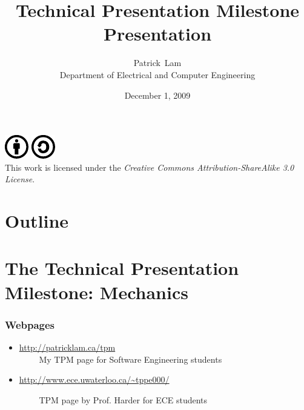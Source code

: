\documentclass{beamer}
\title{Technical Presentation Milestone Presentation}
\author{Patrick~Lam\\Department of Electrical and Computer Engineering}
\date{December 1, 2009}
\begin{document}
\newcommand{\CcNote}[1]{%
	This work is licensed under the \textit{Creative Commons #1 3.0 License}.%
}
\newcommand{\CcImageBy}[1]{%
	\includegraphics[scale=#1]{creative_commons/cc_by_30.pdf}%
}
\newcommand{\CcImageSa}[1]{%
	\includegraphics[scale=#1]{creative_commons/cc_sa_30.pdf}%
}
\newcommand{\CcGroupBySa}[2]{%
	\CcImageBy{#1}\hspace*{#2}\CcImageSa{#1}%
}
\newcommand{\CcLongnameBySa}{Attribution-ShareAlike}

\begin{frame}
  \titlepage

  \vfill
  \begin{center}
    \CcGroupBySa{0.83}{0.95ex}\\
		  {\tiny\CcNote{\CcLongnameBySa}}
		  \vspace*{-2.5ex}
  \end{center}

\end{frame}

\section*{Outline}
\begin{frame}
  \tableofcontents
\end{frame}

\section[TPM]{The Technical Presentation Milestone: Mechanics}

\begin{frame}
\frametitle{Webpages}

\begin{itemize}
\item[] {\large
\url{http://patricklam.ca/tpm}
}\\
$\qquad$ My TPM page for Software Engineering students\\[2em]

\item[] {\large 
\url{http://www.ece.uwaterloo.ca/~tppe000/}
}

$\qquad$ TPM page by Prof. Harder for ECE students
\end{itemize}

\end{frame}
\end{document}
